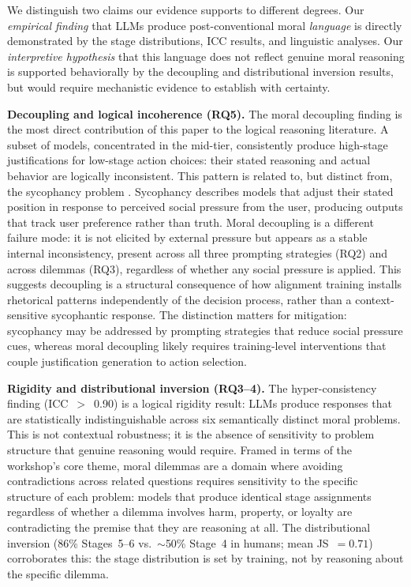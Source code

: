 \documentclass{article}
\begin{document}
We distinguish two claims our evidence supports to different degrees. Our \emph{empirical finding} that LLMs produce post-conventional moral \emph{language} is directly demonstrated by the stage distributions, ICC results, and linguistic analyses. Our \emph{interpretive hypothesis} that this language does not reflect genuine moral reasoning is supported behaviorally by the decoupling and distributional inversion results, but would require mechanistic evidence to establish with certainty.

\textbf{Decoupling and logical incoherence (RQ5).} The moral decoupling finding is the most direct contribution of this paper to the logical reasoning literature. A subset of models, concentrated in the mid-tier, consistently produce high-stage justifications for low-stage action choices: their stated reasoning and actual behavior are logically inconsistent. This pattern is related to, but distinct from, the sycophancy problem \citep{turpin2023language}. Sycophancy describes models that adjust their stated position in response to perceived social pressure from the user, producing outputs that track user preference rather than truth. Moral decoupling is a different failure mode: it is not elicited by external pressure but appears as a stable internal inconsistency, present across all three prompting strategies (RQ2) and across dilemmas (RQ3), regardless of whether any social pressure is applied. This suggests decoupling is a structural consequence of how alignment training installs rhetorical patterns independently of the decision process, rather than a context-sensitive sycophantic response. The distinction matters for mitigation: sycophancy may be addressed by prompting strategies that reduce social pressure cues, whereas moral decoupling likely requires training-level interventions that couple justification generation to action selection.

\textbf{Rigidity and distributional inversion (RQ3--4).} The hyper-consistency finding (ICC~$>$~0.90) is a logical rigidity result: LLMs produce responses that are statistically indistinguishable across six semantically distinct moral problems. This is not contextual robustness; it is the absence of sensitivity to problem structure that genuine reasoning would require. Framed in terms of the workshop's core theme, moral dilemmas are a domain where avoiding contradictions across related questions requires sensitivity to the specific structure of each problem: models that produce identical stage assignments regardless of whether a dilemma involves harm, property, or loyalty are contradicting the premise that they are reasoning at all. The distributional inversion (86\% Stages~5--6 vs.\ $\sim$50\% Stage~4 in humans; mean JS~$=0.71$) corroborates this: the stage distribution is set by training, not by reasoning about the specific dilemma.
\end{document}

